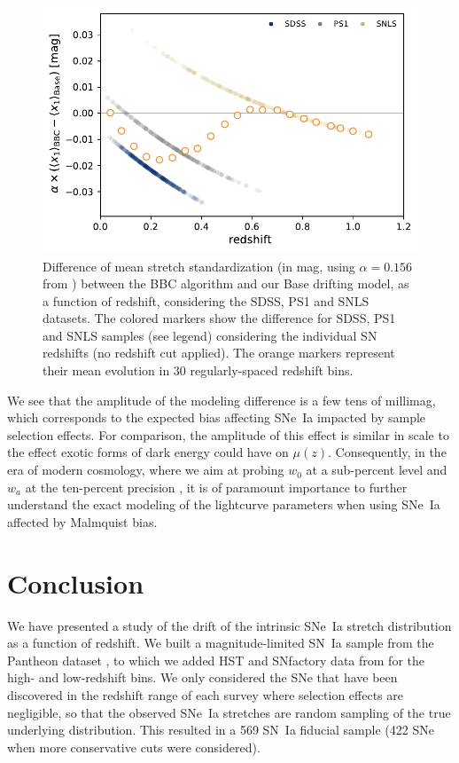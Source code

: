 \documentclass[]{aa} %
\newcommand{\yc}[1]{{\textcolor{BrickRed}{#1}}}
\begin{document}
\begin{figure}
    \centering
    \includegraphics[width=\linewidth]{Article_figures/BBC_-stretchevol_grouped.pdf}
    \caption{Difference of mean stretch standardization (in mag, using
        $\alpha=0.156$ from \citealt{scolnic2018a}) between the BBC algorithm
        and our Base drifting model, as a function of redshift, considering the
        SDSS, PS1 and SNLS datasets. The colored markers show the difference for
        SDSS, PS1 and SNLS samples (see legend) considering the individual SN
    redshifts (no redshift cut applied). The orange markers represent their mean
evolution in 30 regularly-spaced redshift bins.}
    \label{fig:magdrift}
\end{figure}

We see that the amplitude of the modeling difference is a few tens of
millimag, which corresponds to the expected bias affecting SNe~Ia impacted
by sample selection effects. For comparison, the amplitude of this effect is
similar in scale to the effect exotic forms of dark energy could
have on $\mu(z)$. Consequently, in the era of modern cosmology, where we aim at
probing $w_0$ at a sub-percent \yc{level} and $w_a$ at the ten-percent \yc{precision}
\citep[e.g.,][]{lsstpaper}, it is of paramount importance to further
understand the exact modeling of the lightcurve parameters when using SNe~Ia
affected by Malmquist bias.

\section{Conclusion}
\label{sec:ccl}

We have presented a study of the drift of the \yc{intrinsic} SNe~Ia stretch
distribution as a function of redshift. We \yc{built a magnitude-limited SN~Ia sample} from the Pantheon dataset \citep[][SDSS, PS1 and SNLS]{scolnic2018a}, to which we added HST and SNfactory data from \cite{rigault2018} for the
\yc{high- and} low-redshift bins. We only considered the SNe that have been discovered
in the redshift range of each survey where selection effects are negligible, so that the observed SNe~Ia stretches are random sampling of the true underlying
distribution. This \yc{resulted in a} 569 SN~Ia \yc{fiducial sample} (422 SNe when more
conservative cuts were considered).
\end{document}
